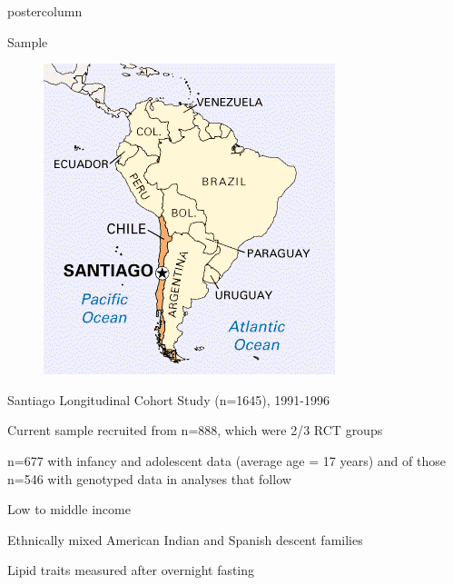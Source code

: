 \documentclass[final]{beamer}\usepackage[]{graphicx}\usepackage[]{color}
\newlength{\onecolwid}
\begin{document}
\begin{frame}[t]
\begin{columns}[T]
\begin{column}{\onecolwid}
\begin{beamercolorbox}[wd=\textwidth]{postercolumn}
\begin{block}{Sample}
\begin{itemize}
    \parbox[t]{\dimexpr\textwidth-\leftmargin}{%
\raggedright
      \begin{figure}
        \centering
        \includegraphics[width=\linewidth]{santiago-map.png}
      \end{figure}
          \item Santiago Longitudinal Cohort Study (n=1645), 1991-1996
          \item \raggedright Current sample recruited from n=888, which were 2/3 RCT groups
          \item  n=677 with infancy and adolescent data (average age = 17 years) and of those n=546 with genotyped data in analyses that follow
          \item  Low to middle income
          \item Ethnically mixed American Indian and Spanish descent families
          \item Lipid traits measured after overnight fasting
    }
  \end{itemize}

 
        

\end{block}
\end{beamercolorbox}
\end{column}
\end{columns}
\end{frame}
\end{document}
